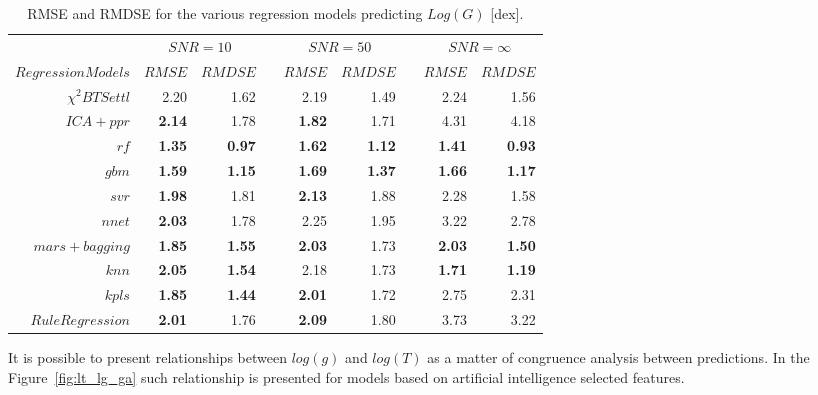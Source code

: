 %
%
\begin{table}\centering
\begin{tabular}{@{}rrrcrrcrr@{}}\toprule
& \multicolumn{2}{c}{$SNR = 10$} & \phantom{ab}& \multicolumn{2}{c}{$SNR = 50$} &
\phantom{ab} & \multicolumn{2}{c}{$SNR = \infty$}\\
\cmidrule{2-3} \cmidrule{5-6} \cmidrule{8-9}
$Regression Models$ & $RMSE$ & $RMDSE$ && $RMSE$ & $RMDSE$     && $RMSE$       & $RMDSE$ \\ \midrule
$\chi^2 BTSettl$    &  2.20     & 1.62  && 2.19 & 1.49 && 2.24  & 1.56 \\
$ ICA+ ppr$         & \bf{2.14} & 1.78  && \bf{1.82} & 1.71 && 4.31  & 4.18 \\
$rf $               & \bf{1.35} & \bf{0.97} && \bf{1.62} & \bf{1.12} && \bf{1.41} & \bf{0.93} \\
$gbm $              & \bf{1.59} & \bf{1.15} && \bf{1.69} & \bf{1.37} && \bf{1.66} & \bf{1.17} \\
$ svr $             & \bf{1.98} & 1.81  && \bf{2.13} & 1.88  && 2.28 & 1.58 \\
$ nnet $            & \bf{2.03} & 1.78  && 2.25 & 1.95 && 3.22 & 2.78 \\
$ mars+ bagging $   & \bf{1.85} & \bf{1.55} && \bf{2.03} & 1.73 && \bf{2.03}  & \bf{1.50} \\
$knn  $             & \bf{2.05} & \bf{1.54} && 2.18 &  1.73  &&  \bf{1.71} & \bf{1.19} \\
$ kpls $            & \bf{1.85} & \bf{1.44} && \bf{2.01} & 1.72 && 2.75 & 2.31 \\
$Rule Regression $  & \bf{2.01} & 1.76 && \bf{2.09} & 1.80 && 3.73 &  3.22 \\

\bottomrule
\end{tabular}
\caption {RMSE and RMDSE for the various regression models predicting $Log(G)$ [dex].} 
\label{tab:models_G_rmse} 
\end{table}


It is possible to present relationships between $log(g)$ and $log(T)$
as a matter of congruence analysis between predictions. In the Figure~\ref{fig:lt_lg_ga}
such relationship is presented for models based on artificial intelligence selected features.

